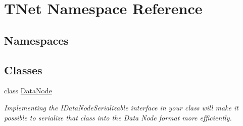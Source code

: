 \hypertarget{namespace_t_net}{}\section{T\+Net Namespace Reference}
\label{namespace_t_net}
\subsection*{Namespaces}
\begin{DoxyCompactItemize}
\end{DoxyCompactItemize}
\subsection*{Classes}
\begin{DoxyCompactItemize}
\item 
class \mbox{\hyperlink{class_t_net_1_1_data_node}{Data\+Node}}
\begin{DoxyCompactList}\small\item\em Implementing the I\+Data\+Node\+Serializable interface in your class will make it possible to serialize that class into the Data Node format more efficiently. \end{DoxyCompactList}\end{DoxyCompactItemize}
